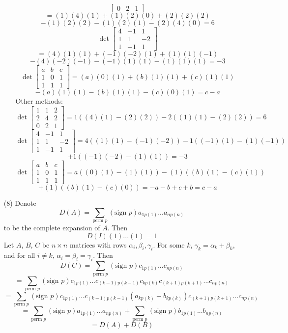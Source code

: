 \documentclass[12pt]{article}
\begin{document}
\begin{itemize}
\begin{itemize}
$$\begin{bmatrix}
0 & 2 & 1
\end{bmatrix}$$
$$= (1)(4)(1) + (1)(2)(0) + (2)(2)(2)$$
$$- (1)(2)(2) - (1)(2)(1) - (2)(4)(0) = 6$$
$$\det\begin{bmatrix}
4 & -1 & 1 \\
1 & 1 & -2 \\
1 & -1 & 1
\end{bmatrix}$$
$$= (4)(1)(1) + (-1)(-2)(1) + (1)(1)(-1)$$ 
$$- (4)(-2)(-1) - (-1)(1)(1) - (1)(1)(1) = -3$$
$$\det\begin{bmatrix}
a & b & c \\
1 & 0 & 1 \\
1 & 1 & 1
\end{bmatrix} = (a)(0)(1) + (b)(1)(1) + (c)(1)(1)$$
$$- (a)(1)(1) - (b)(1)(1) - (c)(0)(1) = c - a$$
Other methods:
$$\det\begin{bmatrix}
1 & 1 & 2 \\
2 & 4 & 2 \\
0 & 2 & 1
\end{bmatrix} = 1((4)(1) - (2)(2)) - 2((1)(1) - (2)(2)) = 6$$
$$\det\begin{bmatrix}
4 & -1 & 1 \\
1 & 1 & -2 \\
1 & -1 & 1
\end{bmatrix} = 4((1)(1) - (-1)(-2)) - 1((-1)(1) - (1)(-1))$$
$$+ 1((-1)(-2) - (1)(1)) = -3$$
$$\det\begin{bmatrix}
a & b & c \\
1 & 0 & 1 \\
1 & 1 & 1
\end{bmatrix} = a((0)(1) - (1)(1)) - (1)((b)(1) - (c)(1))$$
$$+ (1)((b)(1) - (c)(0)) = -a - b + c + b = c - a$$
\end{itemize}
\item[(8)]
Denote 
$$D(A) = \sum_{\text{perm }p}(\text{sign }p)a_{1p(1)}...a_{np(n)}$$
to be the complete expansion of $A$. Then
$$D(I) (1)...(1) = 1$$
Let $A$, $B$, $C$ be $n \times n$ matrices with rows $\alpha_i, \beta_i, \gamma_i$. For some $k$, $\gamma_k = \alpha_k + \beta_k$, and for all $i \neq k$, $\alpha_i = \beta_i = \gamma_i$. Then
$$D(C) = \sum_{\text{perm }p}(\text{sign }p)c_{1p(1)}...c_{np(n)}$$
$$= \sum_{\text{perm }p}(\text{sign }p)c_{1p(1)}...c_{(k-1)p(k-1)}c_{kp(k)}c_{(k+1)p(k+1)}...c_{np(n)}$$
$$= \sum_{\text{perm }p}(\text{sign }p)c_{1p(1)}...c_{(k-1)p(k-1)}(a_{kp(k)} + b_{kp(k)})c_{(k+1)p(k+1)}...c_{np(n)}$$
$$= \sum_{\text{perm }p}(\text{sign }p)a_{1p(1)}...a_{np(n)} + \sum_{\text{perm }p}(\text{sign }p)b_{1p(1)}...b_{np(n)}$$
$$= D(A) + D(B)$$

\end{itemize}
\end{document}
